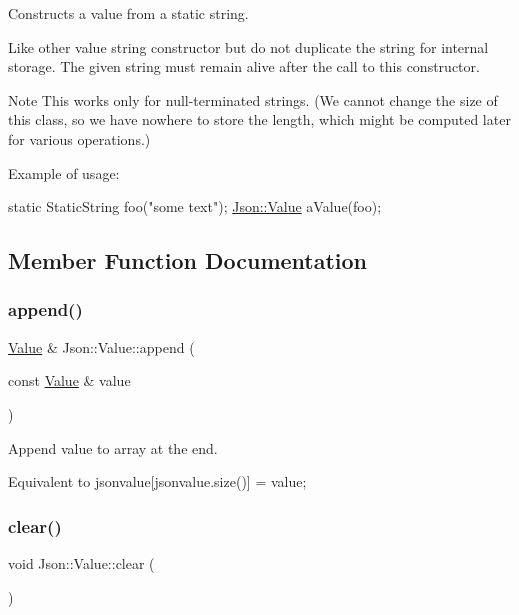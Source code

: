 Constructs a value from a static string. 

Like other value string constructor but do not duplicate the string for internal storage. The given string must remain alive after the call to this constructor. \begin{DoxyNote}{Note}
This works only for null-\/terminated strings. (We cannot change the size of this class, so we have nowhere to store the length, which might be computed later for various operations.)
\end{DoxyNote}
Example of usage\+: 
\begin{DoxyCode}
\textcolor{keyword}{static} StaticString foo(\textcolor{stringliteral}{"some text"});
\hyperlink{class_json_1_1_value}{Json::Value} aValue(foo);
\end{DoxyCode}
 

\subsection{Member Function Documentation}
\mbox{\label{class_json_1_1_value_a7e49ac977e4bcf59745a09d426669f75}} 
\subsubsection{\texorpdfstring{append()}{append()}}
{\footnotesize\ttfamily \hyperlink{class_json_1_1_value}{Value} \& Json\+::\+Value\+::append (\begin{DoxyParamCaption}\item[{const \hyperlink{class_json_1_1_value}{Value} \&}]{value }\end{DoxyParamCaption})}



Append value to array at the end. 

Equivalent to jsonvalue\mbox{[}jsonvalue.\+size()\mbox{]} = value; \mbox{\label{class_json_1_1_value_a501a4d67e6c875255c2ecc03ccd2019b}} 
\subsubsection{\texorpdfstring{clear()}{clear()}}
{\footnotesize\ttfamily void Json\+::\+Value\+::clear (\begin{DoxyParamCaption}{ }\end{DoxyParamCaption})}

